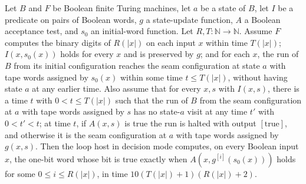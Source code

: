 \begin{theorem}
\label{Turing.FinTM.loopHostTM_decides}
\leanok
{}
Let $B$ and $F$ be Boolean finite Turing machines, let $a$ be a state of $B$, let $I$ be
a predicate on pairs of Boolean words, $g$ a state-update function, $A$ a Boolean
acceptance test, and $s_0$ an initial-word function. Let $R,T:\mathbb{N}\to\mathbb{N}$.
Assume $F$ computes the binary digits of $R(|x|)$ on each input $x$ within time
$T(|x|)$; $I(x,s_0(x))$ holds for every $x$ and is preserved by $g$; and for each $x$,
the run of $B$ from its initial configuration reaches the seam configuration at state
$a$ with tape words assigned by $s_0(x)$ within some time $t\le T(|x|)$, without having
state $a$ at any earlier time. Also assume that for every $x,s$ with $I(x,s)$, there is
a time $t$ with $0<t\le T(|x|)$ such that the run of $B$ from the seam configuration at
$a$ with tape words assigned by $s$ has no state-$a$ visit at any time $t'$ with
$0<t'<t$; at time $t$, if $A(x,s)$ is true the run is halted with output
$[\mathrm{true}]$, and otherwise it is the seam configuration at $a$ with tape words
assigned by $g(x,s)$. Then the loop host in decision mode computes, on every Boolean
input $x$, the one-bit word whose bit is true exactly when $A(x,g^{[i]}(s_0(x)))$ holds
for some $0\le i\le R(|x|)$, in time $10(T(|x|)+1)(R(|x|)+2)$.
\end{theorem}

